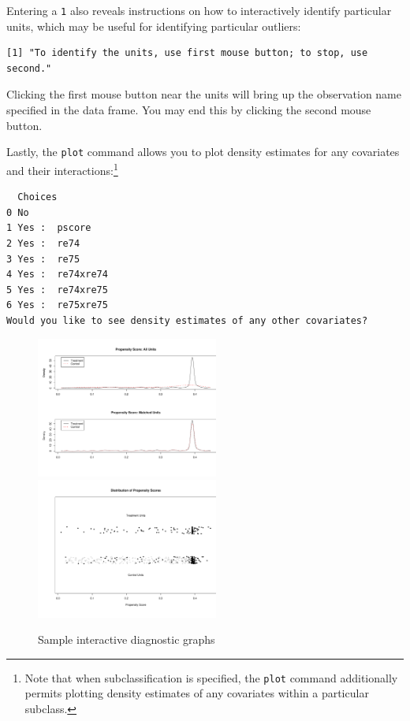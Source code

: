 \documentclass[oneside,letterpaper,titlepage]{article}
\begin{document}
Entering a \texttt{1} also reveals instructions on how to
interactively identify particular units, which may be useful for
identifying particular outliers: 

\begin{verbatim}
[1] "To identify the units, use first mouse button; to stop, use
second."
\end{verbatim}

Clicking the first mouse button near the units will bring up the
observation name specified in the data frame.  You may end this by
clicking the second mouse button. 

Lastly, the \texttt{plot} command allows you to plot density estimates
for any covariates and their interactions:\footnote{Note that when
  subclassification is specified, the \texttt{plot} command
  additionally permits plotting density estimates of any covariates
  within a particular subclass.}

\begin{verbatim}
  Choices         
0 No              
1 Yes :  pscore   
2 Yes :  re74     
3 Yes :  re75     
4 Yes :  re74xre74
5 Yes :  re74xre75
6 Yes :  re75xre75
Would you like to see density estimates of any other covariates?
\end{verbatim}

\begin{figure}[h]
  \begin{center}
    \includegraphics[width=2.35in,angle=0]{figs/f2figa}
    \includegraphics[width=2.35in,angle=0]{figs/f2figb}
    \hfill
    \caption{Sample interactive diagnostic graphs}
    \label{f2diags}
  \end{center}
\end{figure}
\end{document}
